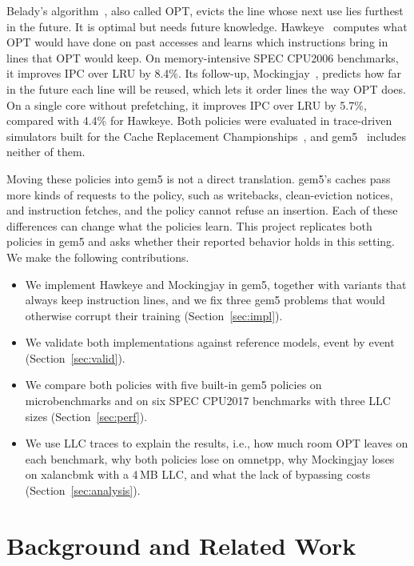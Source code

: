 \documentclass[11pt,conference]{IEEEtran}
\begin{document}
Belady's algorithm~\cite{belady}, also called OPT, evicts the line whose next
use lies furthest in the future. It is optimal but needs future knowledge.
Hawkeye~\cite{hawkeye} computes what OPT would have done on past accesses and
learns which instructions bring in lines that OPT would keep. On
memory-intensive SPEC CPU2006 benchmarks, it improves IPC over LRU by 8.4\%.
Its follow-up, Mockingjay~\cite{mockingjay}, predicts how far in the future
each line will be reused, which lets it order lines the way OPT does. On a
single core without prefetching, it improves IPC over LRU by 5.7\%, compared
with 4.4\% for Hawkeye. Both policies were evaluated in trace-driven
simulators built for the Cache Replacement Championships~\cite{crc2}, and
gem5~\cite{gem5,gem5v20} includes neither of them.

Moving these policies into gem5 is not a direct translation. gem5's caches
pass more kinds of requests to the policy, such as writebacks, clean-eviction
notices, and instruction fetches, and the policy cannot refuse an insertion.
Each of these differences can change what the policies learn. This project
replicates both policies in gem5 and asks whether their reported behavior holds
in this setting. We make the following contributions.

\begin{itemize}
\item We implement Hawkeye and Mockingjay in gem5, together with variants that
always keep instruction lines, and we fix three gem5 problems that would
otherwise corrupt their training (Section~\ref{sec:impl}).
\item We validate both implementations against reference models, event by
event (Section~\ref{sec:valid}).
\item We compare both policies with five built-in gem5 policies on
microbenchmarks and on six SPEC CPU2017 benchmarks with three LLC sizes
(Section~\ref{sec:perf}).
\item We use LLC traces to explain the results, i.e., how much room OPT leaves
on each benchmark, why both policies lose on omnetpp, why Mockingjay loses on
xalancbmk with a 4\,MB LLC, and what the lack of bypassing costs
(Section~\ref{sec:analysis}).
\end{itemize}

\section{Background and Related Work}
\end{document}
